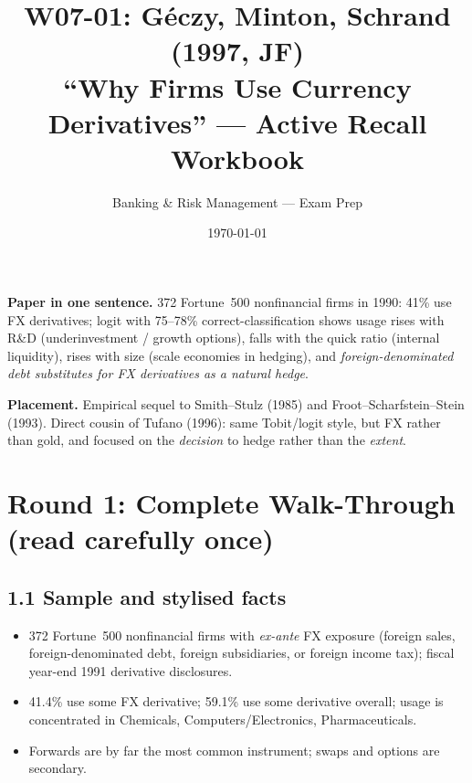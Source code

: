 \documentclass[11pt]{article}
\title{W07-01: G\'eczy, Minton, Schrand (1997, JF) \\
\large ``Why Firms Use Currency Derivatives'' --- Active Recall Workbook}
\author{Banking \& Risk Management --- Exam Prep}
\date{\today}
\begin{document}
\maketitle

\begin{keybox}
\textbf{Paper in one sentence.} 372 Fortune~500 nonfinancial firms in 1990: 41\% use FX derivatives; logit with 75--78\% correct-classification shows usage rises with R\&D (underinvestment / growth options), falls with the quick ratio (internal liquidity), rises with size (scale economies in hedging), and \emph{foreign-denominated debt substitutes for FX derivatives as a natural hedge}.

\textbf{Placement.} Empirical sequel to Smith--Stulz (1985) and Froot--Scharfstein--Stein (1993). Direct cousin of Tufano (1996): same Tobit/logit style, but FX rather than gold, and focused on the \emph{decision} to hedge rather than the \emph{extent}.
\end{keybox}

\section*{Round 1: Complete Walk-Through (read carefully once)}

\subsection*{1.1 Sample and stylised facts}
\begin{itemize}
\item 372 Fortune~500 nonfinancial firms with \emph{ex-ante} FX exposure (foreign sales, foreign-denominated debt, foreign subsidiaries, or foreign income tax); fiscal year-end 1991 derivative disclosures.
\item 41.4\% use some FX derivative; 59.1\% use some derivative overall; usage is concentrated in Chemicals, Computers/Electronics, Pharmaceuticals.
\item Forwards are by far the most common instrument; swaps and options are secondary.
\end{itemize}
\end{document}
